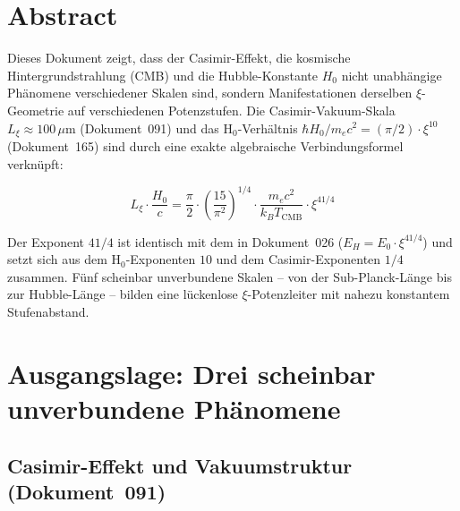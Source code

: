 
\section*{Abstract}

Dieses Dokument zeigt, dass der Casimir-Effekt, die kosmische Hintergrundstrahlung (CMB)
und die Hubble-Konstante $H_0$ nicht unabhängige Phänomene verschiedener Skalen sind,
sondern Manifestationen derselben $\xi$-Geometrie auf verschiedenen Potenzstufen.
Die Casimir-Vakuum-Skala $L_\xi \approx 100\,\mu\text{m}$ (Dokument~091) und das
H$_0$-Verhältnis $\hbar H_0 / m_e c^2 = (\pi/2)\cdot\xi^{10}$ (Dokument~165)
sind durch eine exakte algebraische Verbindungsformel verknüpft:

\begin{equation}
    \boxed{L_\xi \cdot \frac{H_0}{c}
    = \frac{\pi}{2}\cdot\left(\frac{15}{\pi^2}\right)^{\!1/4}
    \cdot \frac{m_e c^2}{k_B T_\text{CMB}} \cdot \xi^{41/4}}
    \label{eq:bridge_main}
\end{equation}

Der Exponent $41/4$ ist identisch mit dem in Dokument~026 ($E_H = E_0 \cdot \xi^{41/4}$)
und setzt sich aus dem H$_0$-Exponenten $10$ und dem Casimir-Exponenten $1/4$ zusammen.
Fünf scheinbar unverbundene Skalen -- von der Sub-Planck-Länge bis zur Hubble-Länge --
bilden eine lückenlose $\xi$-Potenzleiter mit nahezu konstantem Stufenabstand.

\clearpage

\section{Ausgangslage: Drei scheinbar unverbundene Phänomene}
\label{sec:ausgangslage}

\subsection{Casimir-Effekt und Vakuumstruktur (Dokument~091)}

